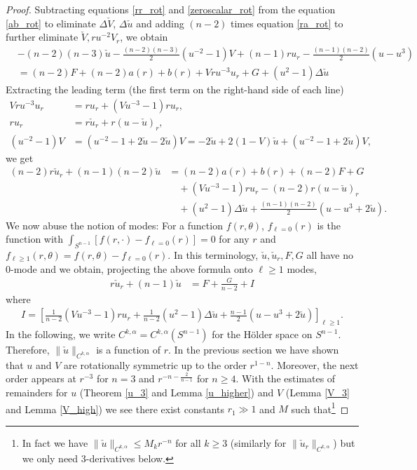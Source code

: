 \documentclass[12pt,twoside]{article}
\theoremstyle{plain}
\theoremstyle{definition}
\theoremstyle{remark}
\newcommand{\lt}{\left}
\newcommand{\rt}{\right}
\newcommand{\cu}{\check{u}}
\newcommand{\cV}{\check{V}}
\numberwithin{equation}{section}
\begin{document}
\begin{proof}
Subtracting equations \eqref{rr_rot} and \eqref{zeroscalar_rot} from the equation \eqref{ab_rot} to eliminate $\Delta \cV$, $\Delta \cu$ and adding $(n-2)$ times equation \eqref{ra_rot} to further eliminate $\cV, ru^{-2}V_r$, we obtain
\begin{align*}
&-(n-2)(n-3)\cu  - \frac{(n-2)(n-3)}{2} (u^{-2}-1)V + (n-1)r u_r - \frac{(n-1)(n-2)}{2}(u - u^3) \\
&= (n-2)F + (n-2)a(r) + b(r) + Vr u^{-3} u_r + G + (u^2-1)\Delta\cu \end{align*} 
Extracting the leading term (the first term on the right-hand side of each line) \begin{align*}
V r u^{-3} u_r &= ru_r + (Vu^{-3}-1) ru_r,\\
ru_r &= r \cu_r + r(u - \cu)_r,\\
(u^{-2}-1)V &= (u^{-2}-1 + 2\cu - 2 \cu)V = -2 \cu + 2 (1-V) \cu + (u^{-2}-1+2\cu ) V,
\end{align*}
we get
\begin{align*}
(n-2) r \cu_r + (n-1)(n-2) \cu &= (n-2)a(r) + b(r) + (n-2)F + G \\
&\quad + (Vu^{-3}-1) r u_r  - (n-2)r (u - \cu)_r \\ & \quad + (u^2-1)\Delta \cu + \frac{(n-1)(n-2)}{2}(u - u^3 + 2\cu). 
\end{align*}
We now abuse the notion of modes: For a function $f(r,\theta)$, $f_{\ell=0}(r)$ is the function with $\int_{S^{n-1}} [f(r,\cdot) - f_{\ell=0}(r)] =0$ for any $r$ and $f_{\ell\ge 1}(r,\theta) = f(r,\theta) - f_{\ell=0}(r)$. In this terminology, $\cu, \cu_r, F, G$ all have no 0-mode and we obtain, projecting the above formula onto $\ell \ge 1$ modes, 
\begin{align}\label{ODE for cu}
r \cu_r + (n-1) \cu &= F+ \frac{G}{n-2} + I 
\end{align}
where
\begin{align*}
I = \lt[ \frac{1}{n-2}(Vu^{-3}-1)ru_r + \frac{1}{n-2} (u^2-1)\Delta \cu + \frac{n-1}{2}(u - u^3 + 2\cu) \rt]_{\ell\ge 1}.
\end{align*}
In the following, we write $C^{k,\alpha} = C^{k,\alpha}(S^{n-1})$ for the H\"{o}lder space on $S^{n-1}$. Therefore, $\| \check u\|_{C^{k,\alpha}}$ is a function of $r$. In the previous section we have shown that $u$ and $V$ are rotationally symmetric up to the order $r^{1-n}$. Moreover, the next order appears at $r^{-3}$ for $n=3$ and $r^{-n-\frac{2}{n-1}}$ for $n \ge 4$. With the estimates of remainders for $u$ (Theorem \ref{u_3} and Lemma \ref{u_higher}) and $V$ (Lemma \ref{V_3} and Lemma \ref{V_high}) we see there exist constants $r_1 \gg 1$ and $M$ such that\footnote{In fact we have $\| \check u\|_{C^{k,\alpha}} \le M_k r^{-n}$ for all $k \ge 3$ (similarly for $\| \check u_r\|_{C^{k,\alpha}}$) but we only need 3-derivatives below.}

\end{proof}
\end{document}
